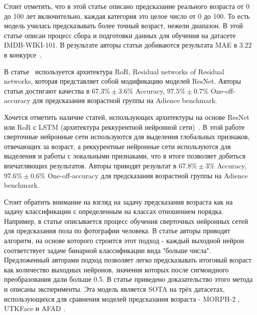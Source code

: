Стоит отметить, что в этой статье описано предсказание реального возраста от 0 до 100 лет включительно, каждая категория это целое число от 0 до 100.
То есть модель училась предсказывать более точный возраст, нежели диапазон.
В этой статье описан процесс сбора и подготовки данных для обучения на датасете IMDB-WIKI-101\cite{imdb_db}.
В результате авторы статьи добиваются результата MAE в $3.22$ в конкурсе~\cite{lap}.
\par В статье~\cite{ror} используется архитектура RoR, Residual networks of Residual networks,
которая представляет собой модификацию моделей ResNet.
Авторы статьи достигают качества в $67.3\% \pm 3.6 \%$ Accuracy,
$97.5\% \pm 0.7\%$ One-off-accuracy для предсказания возрастной группы на Adience benchmark.
\par Хочется отметить наличие статей, использующих архитектуры на основе ResNet или RoR с LSTM (архитектура реккурентной нейронной сети)~\cite{lstm}.
В этой работе сверточные нейронные сети используются для выделения глобальных признаков, отвечающих за возраст,
а реккурентные нейронные сети используются для выделения и работы с локальными признаками, что в итоге позволяет добиться впечатляющих результатов.
Авторы приводят результат в $67.8\% \pm 3 \%$ Accuracy,
$97.6\% \pm 0.6\%$ One-off-accuracy для предсказания возрастной группы на Adience benchmark.
\par Стоит обратить внимание на взгляд на задачу предсказания возраста как на задачу классификации с определенным на классах отношением порядка.
Например, в статье \cite{order} описывается процесс обучения сверточных нейронных сетей для предсказания пола по фотографии человека.
В статье авторы приводят алгоритм, на основе которого строится этот подход - каждый выходной нейрон соответствует задаче бинарной классификации вида "больше числа".
Предложенный авторами подход позволяет легко предсказывать итоговый возраст как количество выходных нейронов, значения которых после сигмоидного преобразования дали больше 0.5.
В статье приведено доказательство этого метода и описаны эксперименты.
Эта модель является SOTA на трёх датасетах, использующихся для сравнения моделей предсказания возраста - MORPH-2 \cite{morph}, UTKFace \cite{utk} и AFAD \cite{afad}.
\newpage
